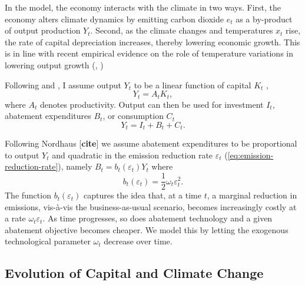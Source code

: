 \documentclass[../../main.tex]{subfiles}
\begin{document}
In the model, the economy interacts with the climate in two ways. First, the economy alters climate dynamics by emitting carbon dioxide $e_t$ as a by-product of output production $Y_t$. Second, as the climate changes and temperatures $x_t$ rise, the rate of capital depreciation increases, thereby lowering economic growth. This is in line with recent empirical evidence on the role of temperature variations in lowering output growth (\citeauthor{dell_temperature_2012}, \citeyear{dell_temperature_2012, dell_temperature_2009}) 

Following  and , I assume output $Y_t$ to be a linear function of capital $K_t$ , \begin{equation}
Y_t =  A_t K_t,
\end{equation} where $A_t$ denotes productivity. Output can then be used for investment $I_t$, abatement expenditures $B_t$, or consumption $C_t$ \begin{equation} \label{eq:nominal-budget}
    Y_t = I_t + B_t + C_t.
\end{equation}

Following Nordhaus [\textbf{cite}] we assume abatement expenditures to be proportional to output $Y_t$ and quadratic in the emission reduction rate $\varepsilon_t$ (\ref{eq:emission-reduction-rate}), namely $B_t = b_t(\varepsilon_t) Y_t $ where \begin{equation} \label{eq:abatement-costs}
    b_t(\varepsilon_t) = \frac{1}{2} \omega_t \varepsilon_t^2.
\end{equation} The function $b_t(\varepsilon_t)$ captures the idea that, at a time $t$, a marginal reduction in emissions, vis-à-vis the business-as-usual scenario, becomes increasingly costly at a rate $\omega_t \varepsilon_t$. As time progresses, so does abatement technology and a given abatement objective becomes cheaper. We model this by letting the exogenous technological parameter $\omega_t$ decrease over time.

\subsection{Evolution of Capital and Climate Change}
\end{document}
